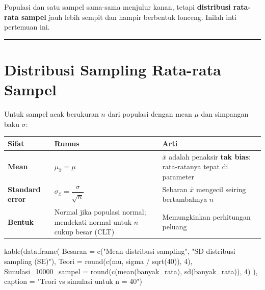 \documentclass[
  indonesian,
  letterpaper,
]{book}
\newenvironment{Shaded}{\begin{snugshade}}{\end{snugshade}}
\newcommand{\AttributeTok}[1]{\textcolor[rgb]{0.40,0.45,0.13}{#1}}
\newcommand{\DecValTok}[1]{\textcolor[rgb]{0.68,0.00,0.00}{#1}}
\newcommand{\FunctionTok}[1]{\textcolor[rgb]{0.28,0.35,0.67}{#1}}
\newcommand{\NormalTok}[1]{\textcolor[rgb]{0.00,0.23,0.31}{#1}}
\newcommand{\SpecialCharTok}[1]{\textcolor[rgb]{0.37,0.37,0.37}{#1}}
\newcommand{\StringTok}[1]{\textcolor[rgb]{0.13,0.47,0.30}{#1}}
\newcounter{none} %
\begin{document}
Populasi dan satu sampel sama-sama menjulur kanan, tetapi
\textbf{distribusi rata-rata sampel} jauh lebih sempit dan hampir
berbentuk lonceng. Inilah inti pertemuan ini.

\begin{center}\rule{0.5\linewidth}{0.5pt}\end{center}

\section{Distribusi Sampling Rata-rata
Sampel}\label{distribusi-sampling-rata-rata-sampel}

Untuk sampel acak berukuran \(n\) dari populasi dengan mean \(\mu\) dan
simpangan baku \(\sigma\):

{\def\LTcaptype{none} %
\begin{longtable}[]{@{}
  >{\raggedright\arraybackslash}p{}
  >{\raggedright\arraybackslash}p{}
  >{\raggedright\arraybackslash}p{}@{}}
\toprule\noalign{}
\begin{minipage}[b]{\linewidth}\raggedright
Sifat
\end{minipage} & \begin{minipage}[b]{\linewidth}\raggedright
Rumus
\end{minipage} & \begin{minipage}[b]{\linewidth}\raggedright
Arti
\end{minipage} \\
\midrule\noalign{}
\endhead
\bottomrule\noalign{}
\endlastfoot
\textbf{Mean} & \(\mu_{\bar{x}} = \mu\) & \(\bar{x}\) adalah penaksir
\textbf{tak bias}: rata-ratanya tepat di parameter \\
\textbf{Standard error} &
\(\sigma_{\bar{x}} = \dfrac{\sigma}{\sqrt{n}}\) & Sebaran \(\bar{x}\)
mengecil seiring bertambahnya \(n\) \\
\textbf{Bentuk} & Normal jika populasi normal; mendekati normal untuk
\(n\) cukup besar (CLT) & Memungkinkan perhitungan peluang \\
\end{longtable}
}

\begin{Shaded}
\begin{Highlighting}[]
\FunctionTok{kable}\NormalTok{(}\FunctionTok{data.frame}\NormalTok{(}
  \AttributeTok{Besaran =} \FunctionTok{c}\NormalTok{(}\StringTok{"Mean distribusi sampling"}\NormalTok{, }\StringTok{"SD distribusi sampling (SE)"}\NormalTok{),}
  \AttributeTok{Teori   =} \FunctionTok{round}\NormalTok{(}\FunctionTok{c}\NormalTok{(mu, sigma }\SpecialCharTok{/} \FunctionTok{sqrt}\NormalTok{(}\DecValTok{40}\NormalTok{)), }\DecValTok{4}\NormalTok{),}
  \AttributeTok{Simulasi\_10000\_sampel =} \FunctionTok{round}\NormalTok{(}\FunctionTok{c}\NormalTok{(}\FunctionTok{mean}\NormalTok{(banyak\_rata), }\FunctionTok{sd}\NormalTok{(banyak\_rata)), }\DecValTok{4}\NormalTok{)}
\NormalTok{), }\AttributeTok{caption =} \StringTok{"Teori vs simulasi untuk n = 40"}\NormalTok{)}
\end{Highlighting}
\end{Shaded}
\end{document}
